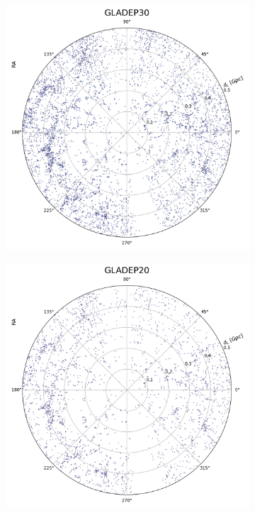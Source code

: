 \begin{figure}[h!]
\begin{subfigure}{0.32\textwidth}
    \label{fig:gladep40}
  \end{subfigure}
  \begin{subfigure}{0.32\textwidth}
    \includegraphics[width=\linewidth]{figures/test_frame_g_7.png}
    \label{fig:gladep30}
  \end{subfigure}
  \begin{subfigure}{0.32\textwidth}
    \includegraphics[width=\linewidth]{figures/test_frame_g_8.png}
    \label{fig:gladep20}
  \end{subfigure}


\end{figure}
